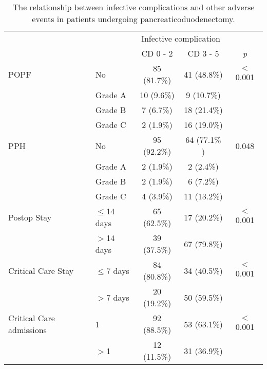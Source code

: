 \begin{table}[p]
	\centering
	\caption{The relationship between infective complications and other adverse events in patients undergoing pancreaticoduodenectomy.}
	\label{table:crp_comp_infect_vs_other_complications}
	\renewcommand{\arraystretch}{1.5} %
	\setlength{\tabcolsep}{9pt} %
	\begin{tabular}{|l l c c c|}
		\hline
		                         &               & \multicolumn{2}{c}{Infective complication} &  \\
		                         &               & CD 0 - 2     & CD 3 - 5                    & \textit{p} \\ \hline
		POPF                     & No            & 85 (81.7\%)  & 41 (48.8\%)                 & $<$0.001   \\
		                         & Grade A       & 10 (9.6\%)   & 9 (10.7\%)                  &  \\
		                         & Grade B       & 7 (6.7\%)    & 18 (21.4\%)                 &  \\
		                         & Grade C       & 2 (1.9\%)    & 16 (19.0\%)                 &  \\
		PPH                      & No            & 95 (92.2\%)  & 64 (77.1\% )                & 0.048      \\
		                         & Grade A       & 2 (1.9\%)    & 2 (2.4\%)                   &  \\
		                         & Grade B       & 2 (1.9\%)    & 6 (7.2\%)                   &  \\
		                         & Grade C       & 4  (3.9\%)   & 11 (13.2\%)                 &  \\
		Postop Stay              & $\leq$14 days & 65 (62.5\%)  & 17 (20.2\%)                 & $<$0.001   \\
		                         & $>$14 days    & 39 (37.5\%)  & 67 (79.8\%)                 &  \\
		Critical Care Stay       & $\leq$7 days  & 84 (80.8\%)  & 34 (40.5\%)                 & $<$0.001   \\
		                         & $>$7 days     & 20 (19.2\%)  & 50 (59.5\%)                 &  \\
		Critical Care admissions & 1             & 92 (88.5\%)  & 53 (63.1\%)                 & $<$0.001   \\
		                         & $>$1          & 12 (11.5\%)  & 31 (36.9\%)                 &  \\

\end{tabular}
\end{table}
